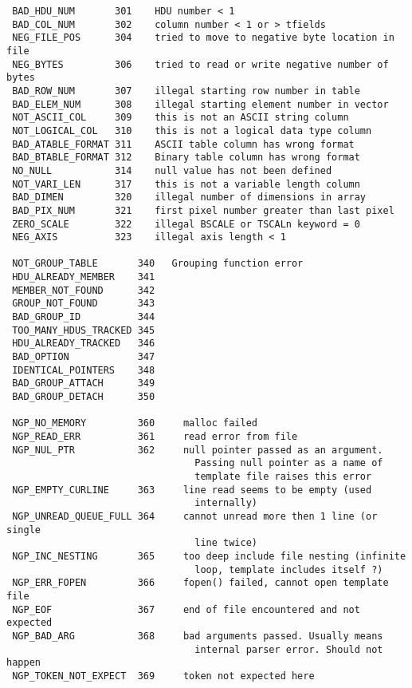 \documentclass[11pt]{book}
\begin{document}
\begin{verbatim}
 BAD_HDU_NUM       301    HDU number < 1
 BAD_COL_NUM       302    column number < 1 or > tfields
 NEG_FILE_POS      304    tried to move to negative byte location in file
 NEG_BYTES         306    tried to read or write negative number of bytes
 BAD_ROW_NUM       307    illegal starting row number in table
 BAD_ELEM_NUM      308    illegal starting element number in vector
 NOT_ASCII_COL     309    this is not an ASCII string column
 NOT_LOGICAL_COL   310    this is not a logical data type column
 BAD_ATABLE_FORMAT 311    ASCII table column has wrong format
 BAD_BTABLE_FORMAT 312    Binary table column has wrong format
 NO_NULL           314    null value has not been defined
 NOT_VARI_LEN      317    this is not a variable length column
 BAD_DIMEN         320    illegal number of dimensions in array
 BAD_PIX_NUM       321    first pixel number greater than last pixel
 ZERO_SCALE        322    illegal BSCALE or TSCALn keyword = 0
 NEG_AXIS          323    illegal axis length < 1

 NOT_GROUP_TABLE       340   Grouping function error
 HDU_ALREADY_MEMBER    341
 MEMBER_NOT_FOUND      342
 GROUP_NOT_FOUND       343
 BAD_GROUP_ID          344
 TOO_MANY_HDUS_TRACKED 345
 HDU_ALREADY_TRACKED   346
 BAD_OPTION            347
 IDENTICAL_POINTERS    348
 BAD_GROUP_ATTACH      349
 BAD_GROUP_DETACH      350

 NGP_NO_MEMORY         360     malloc failed
 NGP_READ_ERR          361     read error from file
 NGP_NUL_PTR           362     null pointer passed as an argument.
                                 Passing null pointer as a name of
                                 template file raises this error
 NGP_EMPTY_CURLINE     363     line read seems to be empty (used
                                 internally)
 NGP_UNREAD_QUEUE_FULL 364     cannot unread more then 1 line (or single
                                 line twice)
 NGP_INC_NESTING       365     too deep include file nesting (infinite
                                 loop, template includes itself ?)
 NGP_ERR_FOPEN         366     fopen() failed, cannot open template file
 NGP_EOF               367     end of file encountered and not expected
 NGP_BAD_ARG           368     bad arguments passed. Usually means
                                 internal parser error. Should not happen
 NGP_TOKEN_NOT_EXPECT  369     token not expected here


\end{verbatim}
\end{document}
